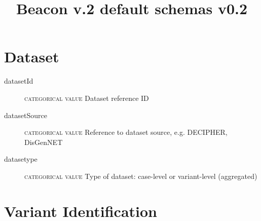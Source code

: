 \documentclass[a4paper, 10pt]{article}        %
\begin{document}
\title{Beacon v.2 default schemas v0.2}
\date{} %
\maketitle





 \section*{{\color{teal}Dataset}}
 \begin{description}
  	\item[datasetId] {\textsc{categorical value}} Dataset reference ID
	\item[datasetSource] {\textsc{categorical value}} Reference to dataset source, e.g. DECIPHER, DisGenNET
	\item[datasetype] {\textsc{categorical value}} Type of dataset: case-level or variant-level (aggregated)  
  \end{description}


\section*{{\color{teal}Variant Identification}}

\end{document}
